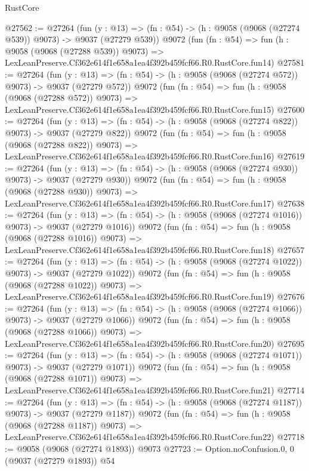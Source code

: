 \begin{lexlean}{RustCore}
\begin{coremodule}
@27562 := @27264
    (fun (y : @13) => (fn : @54) -> (h : @9058 (@9068 (@27274 @539)) @9073) -> @9037 (@27279 @539))
    @9072
    (fun (fn : @54) =>
    fun (h : @9058 (@9068 (@27288 @539)) @9073) =>
    LexLeanPreserve.Cf362e614f1e658a1ea4f392b459fcf66.R0.RustCore.fun14)
@27581 := @27264
    (fun (y : @13) => (fn : @54) -> (h : @9058 (@9068 (@27274 @572)) @9073) -> @9037 (@27279 @572))
    @9072
    (fun (fn : @54) =>
    fun (h : @9058 (@9068 (@27288 @572)) @9073) =>
    LexLeanPreserve.Cf362e614f1e658a1ea4f392b459fcf66.R0.RustCore.fun15)
@27600 := @27264
    (fun (y : @13) => (fn : @54) -> (h : @9058 (@9068 (@27274 @822)) @9073) -> @9037 (@27279 @822))
    @9072
    (fun (fn : @54) =>
    fun (h : @9058 (@9068 (@27288 @822)) @9073) =>
    LexLeanPreserve.Cf362e614f1e658a1ea4f392b459fcf66.R0.RustCore.fun16)
@27619 := @27264
    (fun (y : @13) => (fn : @54) -> (h : @9058 (@9068 (@27274 @930)) @9073) -> @9037 (@27279 @930))
    @9072
    (fun (fn : @54) =>
    fun (h : @9058 (@9068 (@27288 @930)) @9073) =>
    LexLeanPreserve.Cf362e614f1e658a1ea4f392b459fcf66.R0.RustCore.fun17)
@27638 := @27264
    (fun (y : @13) =>
    (fn : @54) -> (h : @9058 (@9068 (@27274 @1016)) @9073) -> @9037 (@27279 @1016))
    @9072
    (fun (fn : @54) =>
    fun (h : @9058 (@9068 (@27288 @1016)) @9073) =>
    LexLeanPreserve.Cf362e614f1e658a1ea4f392b459fcf66.R0.RustCore.fun18)
@27657 := @27264
    (fun (y : @13) =>
    (fn : @54) -> (h : @9058 (@9068 (@27274 @1022)) @9073) -> @9037 (@27279 @1022))
    @9072
    (fun (fn : @54) =>
    fun (h : @9058 (@9068 (@27288 @1022)) @9073) =>
    LexLeanPreserve.Cf362e614f1e658a1ea4f392b459fcf66.R0.RustCore.fun19)
@27676 := @27264
    (fun (y : @13) =>
    (fn : @54) -> (h : @9058 (@9068 (@27274 @1066)) @9073) -> @9037 (@27279 @1066))
    @9072
    (fun (fn : @54) =>
    fun (h : @9058 (@9068 (@27288 @1066)) @9073) =>
    LexLeanPreserve.Cf362e614f1e658a1ea4f392b459fcf66.R0.RustCore.fun20)
@27695 := @27264
    (fun (y : @13) =>
    (fn : @54) -> (h : @9058 (@9068 (@27274 @1071)) @9073) -> @9037 (@27279 @1071))
    @9072
    (fun (fn : @54) =>
    fun (h : @9058 (@9068 (@27288 @1071)) @9073) =>
    LexLeanPreserve.Cf362e614f1e658a1ea4f392b459fcf66.R0.RustCore.fun21)
@27714 := @27264
    (fun (y : @13) =>
    (fn : @54) -> (h : @9058 (@9068 (@27274 @1187)) @9073) -> @9037 (@27279 @1187))
    @9072
    (fun (fn : @54) =>
    fun (h : @9058 (@9068 (@27288 @1187)) @9073) =>
    LexLeanPreserve.Cf362e614f1e658a1ea4f392b459fcf66.R0.RustCore.fun22)
@27718 := @9058 (@9068 (@27274 @1893)) @9073
@27723 := Option.noConfusion.{0, 0} (@9037 (@27279 @1893)) @54

\end{coremodule}
\end{lexlean}
